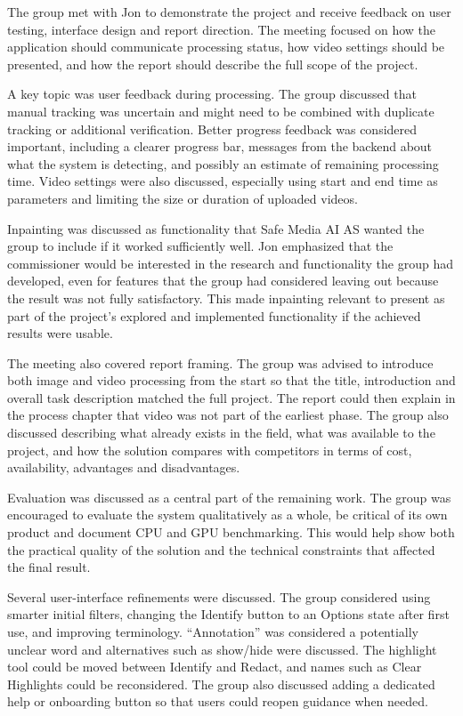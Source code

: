 The group met with Jon to demonstrate the project and receive feedback on user testing, interface design and report direction. The meeting focused on how the application should communicate processing status, how video settings should be presented, and how the report should describe the full scope of the project.

A key topic was user feedback during processing. The group discussed that manual tracking was uncertain and might need to be combined with duplicate tracking or additional verification. Better progress feedback was considered important, including a clearer progress bar, messages from the backend about what the system is detecting, and possibly an estimate of remaining processing time. Video settings were also discussed, especially using start and end time as parameters and limiting the size or duration of uploaded videos.

Inpainting was discussed as functionality that Safe Media AI AS wanted the group to include if it worked sufficiently well. Jon emphasized that the commissioner would be interested in the research and functionality the group had developed, even for features that the group had considered leaving out because the result was not fully satisfactory. This made inpainting relevant to present as part of the project's explored and implemented functionality if the achieved results were usable.

The meeting also covered report framing. The group was advised to introduce both image and video processing from the start so that the title, introduction and overall task description matched the full project. The report could then explain in the process chapter that video was not part of the earliest phase. The group also discussed describing what already exists in the field, what was available to the project, and how the solution compares with competitors in terms of cost, availability, advantages and disadvantages.

Evaluation was discussed as a central part of the remaining work. The group was encouraged to evaluate the system qualitatively as a whole, be critical of its own product and document CPU and GPU benchmarking. This would help show both the practical quality of the solution and the technical constraints that affected the final result.

Several user-interface refinements were discussed. The group considered using smarter initial filters, changing the Identify button to an Options state after first use, and improving terminology. ``Annotation'' was considered a potentially unclear word and alternatives such as show/hide were discussed. The highlight tool could be moved between Identify and Redact, and names such as Clear Highlights could be reconsidered. The group also discussed adding a dedicated help or onboarding button so that users could reopen guidance when needed.

